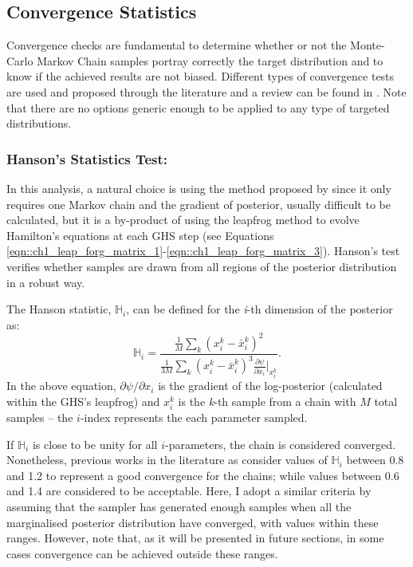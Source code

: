 \subsection{Convergence Statistics}\label{Sec:BPL:Convergence}
Convergence checks are fundamental to determine whether or not the Monte-Carlo Markov Chain samples portray correctly the target distribution and to know if the achieved results are not biased. Different types of convergence tests are used and proposed through the literature and a review can be found in \cite{2017Deonovic}. Note that there are no options generic enough to be applied to any type of targeted distributions.

\subsubsection{Hanson's Statistics Test:}
In this analysis, a natural choice is using the method proposed by \cite{Hanson2001} since it only requires one Markov chain and the gradient of posterior, usually difficult to be calculated, but it is a by-product of using the leapfrog method to evolve Hamilton's equations at each GHS step (see Equations \eqref{eqn::ch1_leap_forg_matrix_1}-\eqref{eqn::ch1_leap_forg_matrix_3}). Hanson's test verifies whether samples are drawn from all regions of the posterior distribution in a robust way. 

\qquad The Hanson statistic, $\mathbb{H}_i$, can be defined for the \textit{i}-th dimension of the posterior as:
\begin{equation}
 \mathbb{H}_i=\frac{\frac{1}{M}\sum_k\left(x_i^k-\bar{x}_i^k\right)^2}{ \frac{1}{3M}\sum_k\left(x_i^k-\bar{x}_i^k\right)^3\frac{\partial\psi}{\partial x_i}\Big|_{x_i^k} }.
 \end{equation}
In the above equation, $\partial\psi/\partial x_i$ is the gradient of the log-posterior (calculated within the GHS's leapfrog) and $x_i^k$ is the \textit{k}-th sample from a chain with $M$ total samples -- the $i$-index represents the each parameter sampled.

\qquad If $\mathbb{H}_i$ is close to be unity for all $i$-parameters, the chain is considered converged. Nonetheless, previous works in the literature as \cite{Taylor2008} consider values of $\mathbb{H}_i$ between 0.8 and 1.2 to represent a good convergence for the chains; while values between 0.6 and 1.4 are considered to be acceptable. Here, I adopt a similar criteria by assuming that the sampler has generated enough samples when all the marginalised posterior distribution have converged, with values within these ranges. However, note that, as it will be presented in future sections, in some cases convergence can be achieved outside these ranges.

